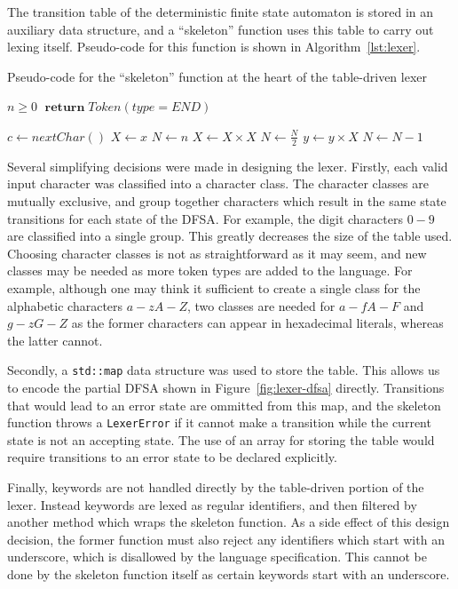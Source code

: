 \documentclass[11pt,a4paper]{scrartcl}
\DeclareMathOperator{\return}{\mathbf{return}}
\begin{document}
The transition table of the deterministic finite state automaton is stored in an auxiliary data structure, and a ``skeleton'' function uses this table to carry out lexing itself. Pseudo-code for this function is shown in Algorithm~\ref{lst:lexer}.

\begin{algorithm}
\caption{Pseudo-code for the ``skeleton'' function at the heart of the table-driven lexer}\label{lst:lexer}
\begin{algorithmic}
  \Require $n \geq 0$
    \State $\return Token(type=END)$
  \EndIf


  \EndWhile
\State $c \gets nextChar()$
\State $X \gets x$
\State $N \gets n$
    \State $X \gets X \times X$
    \State $N \gets \frac{N}{2}$  
    \State $y \gets y \times X$
    \State $N \gets N - 1$
\EndIf
\EndWhile
\end{algorithmic}
\end{algorithm}

Several simplifying decisions were made in designing the lexer. Firstly, each valid input character was classified into a character class. The character classes are mutually exclusive, and group together characters which result in the same state transitions for each state of the DFSA. For example, the digit characters $0-9$ are classified into a single group. This greatly decreases the size of the table used. Choosing character classes is not as straightforward as it may seem, and new classes may be needed as more token types are added to the language. For example, although one may think it sufficient to create a single class for the alphabetic characters $a-zA-Z$, two classes are needed for $a-fA-F$ and $g-zG-Z$ as the former characters can appear in hexadecimal literals, whereas the latter cannot.

Secondly, a \verb!std::map! data structure was used to store the table. This allows us to encode the partial DFSA shown in Figure~\ref{fig:lexer-dfsa} directly. Transitions that would lead to an error state are ommitted from this map, and the skeleton function throws a \verb!LexerError! if it cannot make a transition while the current state is not an accepting state. The use of an array for storing the table would require transitions to an error state to be declared explicitly.

Finally, keywords are not handled directly by the table-driven portion of the lexer. Instead keywords are lexed as regular identifiers, and then filtered by another method which wraps the skeleton function. As a side effect of this design decision, the former function must also reject any identifiers which start with an underscore, which is disallowed by the language specification. This cannot be done by the skeleton function itself as certain keywords start with an underscore.
\end{document}
